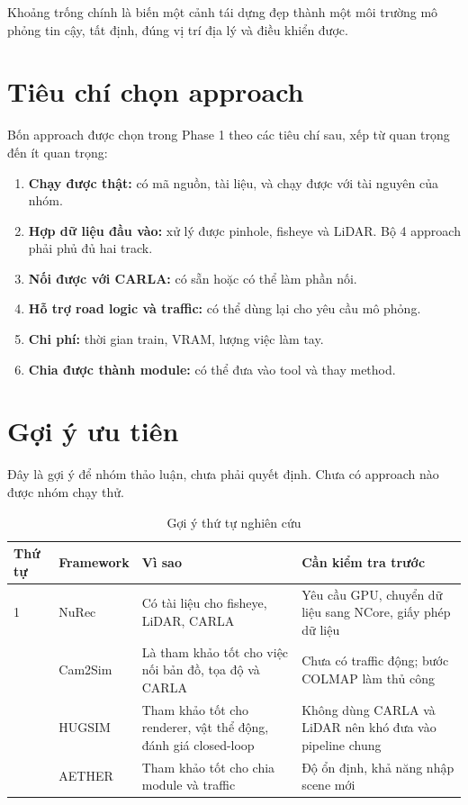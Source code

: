 Khoảng trống chính là biến một cảnh tái dựng đẹp thành một môi trường mô phỏng tin cậy, tất định, đúng vị trí địa lý và điều khiển được.

\section{Tiêu chí chọn approach}

Bốn approach được chọn trong Phase 1 theo các tiêu chí sau, xếp từ quan trọng đến ít quan trọng:
\begin{enumerate}
  \item \textbf{Chạy được thật:} có mã nguồn, tài liệu, và chạy được với tài nguyên của nhóm.
  \item \textbf{Hợp dữ liệu đầu vào:} xử lý được pinhole, fisheye và LiDAR. Bộ 4 approach phải phủ đủ hai track.
  \item \textbf{Nối được với CARLA:} có sẵn hoặc có thể làm phần nối.
  \item \textbf{Hỗ trợ road logic và traffic:} có thể dùng lại cho yêu cầu mô phỏng.
  \item \textbf{Chi phí:} thời gian train, VRAM, lượng việc làm tay.
  \item \textbf{Chia được thành module:} có thể đưa vào tool và thay method.
\end{enumerate}

\section{Gợi ý ưu tiên}

Đây là gợi ý để nhóm thảo luận, chưa phải quyết định. Chưa có approach nào được nhóm chạy thử.

\begin{table}[H]
  \centering
  \small
  \caption{Gợi ý thứ tự nghiên cứu}
  \begin{tabularx}{\linewidth}{l l >{\raggedright\arraybackslash}X >{\raggedright\arraybackslash}X}
    \toprule
    \textbf{Thứ tự} & \textbf{Framework} & \textbf{Vì sao} & \textbf{Cần kiểm tra trước} \\
    \midrule
    1 & NuRec & Có tài liệu cho fisheye, LiDAR, CARLA & Yêu cầu GPU, chuyển dữ liệu sang NCore, giấy phép dữ liệu \\
    \addlinespace
    2 & Cam2Sim & Là tham khảo tốt cho việc nối bản đồ, tọa độ và CARLA & Chưa có traffic động; bước COLMAP làm thủ công \\
    \addlinespace
    3 & HUGSIM & Tham khảo tốt cho renderer, vật thể động, đánh giá closed-loop & Không dùng CARLA và LiDAR nên khó đưa vào pipeline chung \\
    \addlinespace
    4 & AETHER & Tham khảo tốt cho chia module và traffic & Độ ổn định, khả năng nhập scene mới \\
    \bottomrule
  \end{tabularx}
\end{table}

